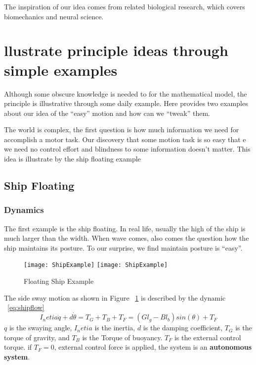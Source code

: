 The inspiration of our idea comes from related biological research, which covers biomechanics and neural science.

\section{llustrate principle ideas through simple examples}

Although some obscure knowledge is needed to for the mathematical model, the principle is illustrative through some daily example. 
Here provides two examples about our idea of the “easy” motion and how can we “tweak” them.

The world is complex, the first question is how much information we need for accomplish a motor task. 
Our discovery that some motion task is so easy that e we need no control effort and blindness to some information doesn’t matter.
This idea is illustrate by the ship floating example

\subsection{Ship Floating}


\subsubsection*{Dynamics}
The first example is the ship floating. 
In real life, usually the high of the ship is much larger than the width. 
When wave comes, also comes the question how the ship maintains its posture.
To our surprise, we find maintain posture is “easy”.



\begin{figure}[!htbp]
  \begin{center}
    \leavevmode
    \ifpdf
      \texttt{[image: ShipExample]}
    \else
      \texttt{[image: ShipExample]}
    \fi
    \caption{Floating Ship Example}
    \label{fig:ShipFloating}
  \end{center}
\end{figure}



The side sway motion as shown in Figure ~\ref{fig:ShipFloating} is described by the dynamic ~\ref{eq:shipflow}
\begin{equation}
I_netia\ddot{q}+d\dot{\theta}=T_{G}+T_{B}+T_{F}=(Gl_{g}-Bl_{b})sin(\theta)+T_{F}
\label{eq:shipflow}
\end{equation}
$q$ is the swaying angle,
$I_netia$ is the inertia,  
$d$ is the damping coefficient,
$T_{G}$ is the torque of gravity, and $T_{B}$ is the Torque of buoyancy.
$T_{F}$ is the external control torque.
if $T_{F}=0$, external control force is applied, the system is an \textbf{autonomous system}.





